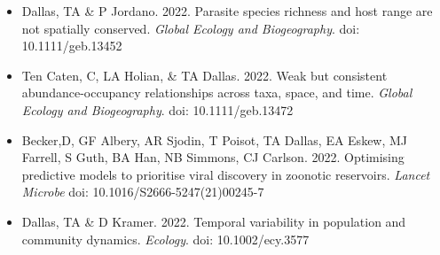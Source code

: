 \documentclass[]{CV}
\begin{document}
\begin{itemize}
\item {\mefont Dallas, TA} \& P Jordano. 2022. Parasite species richness and host range are not spatially conserved. \textit{Global Ecology and Biogeography}. doi: 10.1111/geb.13452

\item Ten Caten, C, LA Holian, \& {\mefont TA Dallas}. 2022. Weak but consistent abundance-occupancy relationships across taxa, space, and time. \textit{Global Ecology and Biogeography}. doi: 10.1111/geb.13472

\item Becker,D, GF Albery, AR Sjodin, T Poisot, {\mefont TA Dallas}, EA Eskew, MJ Farrell, S Guth, BA Han, NB Simmons, CJ Carlson. 2022. Optimising predictive models to prioritise viral discovery in zoonotic reservoirs. \textit{Lancet Microbe} doi: 10.1016/S2666-5247(21)00245-7

\item {\mefont Dallas, TA} \& D Kramer. 2022. Temporal variability in population and community dynamics. \textit{Ecology}. doi: 10.1002/ecy.3577


\end{itemize}






{}
\end{document}
